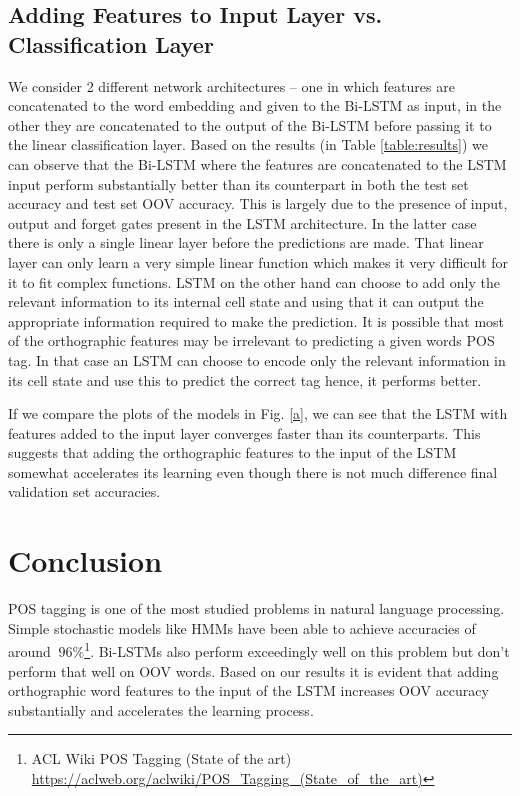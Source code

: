 \documentclass[11pt,letterpaper]{article}
\begin{document}
\subsection{Adding Features to Input Layer vs. Classification Layer}
We consider 2 different network architectures -- one in which features are concatenated to the word embedding and given to the Bi-LSTM as input, in the other they are concatenated to the output of the Bi-LSTM before passing it to the linear classification layer. Based on the results (in Table \ref{table:results}) we can observe that the Bi-LSTM where the features are concatenated to the LSTM input perform substantially better than its counterpart in both the test set accuracy and test set OOV accuracy. This is largely due to the presence of input, output and forget gates present in the LSTM architecture. In the latter case there is only a single linear layer before the predictions are made. That linear layer can only learn a very simple linear function which makes it very difficult for it to fit complex functions. LSTM on the other hand can choose to add only the relevant information to its internal cell state and using that it can output the appropriate information required to make the prediction. It is possible that most of the orthographic features may be irrelevant to predicting a given words POS tag. In that case an LSTM can choose to encode only the relevant information in its cell state and use this to predict the correct tag hence, it performs better.

If we compare the plots of the models in Fig. \ref{a}, we can see that the LSTM with features added to the input layer converges faster than its counterparts. This suggests that adding the orthographic features to the input of the LSTM somewhat accelerates its learning even though there is not much difference final validation set accuracies.

\section{Conclusion}
POS tagging is one of the most studied problems in natural language processing. Simple stochastic models like HMMs have been able to achieve accuracies of around $~96\%$\footnote{ACL Wiki POS Tagging (State of the art) \url{https://aclweb.org/aclwiki/POS_Tagging_(State_of_the_art)}}. Bi-LSTMs also perform exceedingly well on this problem but don't perform that well on OOV words. Based on our results it is evident that adding orthographic word features to the input of the LSTM increases OOV accuracy substantially and accelerates the learning process. 
\end{document}
